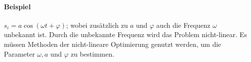 \begin{enumerate}
\paragraph{Beispiel} $s_i=a \cos(\omega t + \varphi)$; wobei zusätzlich zu $a$ und $\varphi$ auch die Frequenz $\omega$ unbekannt ist. Durch die unbekannte Frequenz wird das Problem nicht-linear. Es müssen Methoden der nicht-lineare Optimierung genutzt werden, um die Parameter $\omega, a$ und $\varphi$ zu bestimmen.
\end{enumerate}
